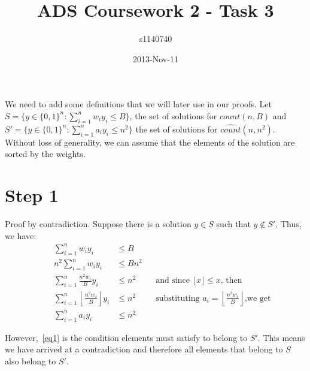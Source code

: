 \documentclass[a4paper]{article}
\title{ADS Coursework 2 - Task 3}
\author{s1140740}
\date{2013-Nov-11}
\begin{document}
\maketitle

\def \counthat {\widehat{count}(n, n^2)}
\def \counthati {\widehat{count}(i, b)}
\def \counthatiminus {\widehat{count}(i-1, b)}
\def \count {count(n, B)}


We need to add some definitions that we will later use in our proofs. Let $S = \{ y \in \{0,1\}^n : \sum_{i=1}^{n}w_iy_i \leq B \}$, the set of solutions for $\count$ and $S' = \{ y \in \{0,1\}^n : \sum_{i=1}^{n}a_iy_i \leq n^2 \}$ the set of solutions for $\counthat$. Without loss of generality, we can assume that the elements of the solution are sorted by the weights.

\section*{Step 1}
Proof by contradiction. Suppose there is a solution $y \in S$ such that $y \not \in S'$.
Thus, we have:
\addtolength{\jot}{1em}
\begin{align*}
    && \sum_{i=1}^{n}w_iy_i &\leq B \\
    && n^2 \sum_{i=1}^{n} w_iy_i &\leq B n^2 \\
    && \sum_{i=1}^{n} \frac{n^2 w_i}{B} y_i &\leq n^2 && \text{and since } \lfloor x \rfloor \leq x \text{, then} \\
    && \sum_{i=1}^{n} \left \lfloor \frac{n^2 w_i}{B} \right \rfloor y_i &\leq n^2 && \text{substituting } a_i = \left \lfloor \frac{n^2w_i}{B} \right \rfloor \text{,we get} \\
    && \sum_{i=1}^{n} a_i y_i &\leq n^2 \tag{\theequation}\label{eq1}
\end{align*}

However,~\eqref{eq1} is the condition elements must satisfy to belong to $S'$.
This means we have arrived at a contradiction and therefore all elements that belong to $S$ also belong to $S'$.
\end{document}
